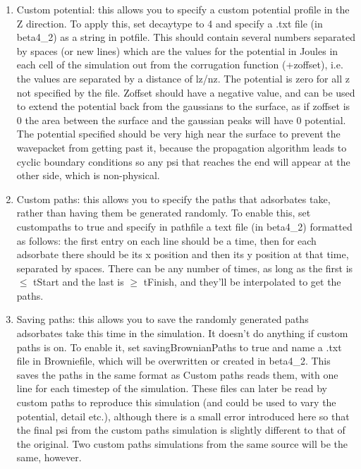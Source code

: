 \documentclass[11pt,letterpaper]{article}
\renewcommand{\\}{\bigskip}
\begin{document}
\begin{enumerate}
    \item Custom potential: this allows you to specify a custom potential profile in the Z direction. To apply this, set decaytype to 4 and specify a .txt file (in beta4\_2) as a string in potfile. This should contain several numbers separated by spaces (or new lines) which are the values for the potential in Joules in each cell of the simulation out from the corrugation function (+zoffset), i.e. the values are separated by a distance of lz/nz. The potential is zero for all z not specified by the file. Zoffset should have a negative value, and can be used to extend the potential back from the gaussians to the surface, as if zoffset is 0 the area between the surface and the gaussian peaks will have 0 potential. The potential specified should be very high near the surface to prevent the wavepacket from getting past it, because the propagation algorithm leads to cyclic boundary conditions so any psi that reaches the end will appear at the other side, which is non-physical.
    \item Custom paths: this allows you to specify the paths that adsorbates take, rather than having them be generated randomly. To enable this, set custompaths to true and specify in pathfile a text file (in beta4\_2) formatted as follows: the first entry on each line should be a time, then for each adsorbate there should be its x position and then its y position at that time, separated by spaces. There can be any number of times, as long as the first is $\leq$ tStart and the last is $\geq$ tFinish, and they’ll be interpolated to get the paths. 
    \item Saving paths: this allows you to save the randomly generated paths adsorbates take this time in the simulation. It doesn’t do anything if custom paths is on. To enable it, set savingBrownianPaths to true and name a .txt file in Browniefile, which will be overwritten or created in beta4\_2. This saves the paths in the same format as Custom paths reads them, with one line for each timestep of the simulation. These files can later be read by custom paths to reproduce this simulation (and could be used to vary the potential, detail etc.), although there is a small error introduced here so that the final psi from the custom paths simulation is slightly different to that of the original. Two custom paths simulations from the same source will be the same, however.
\end{enumerate}
\end{document}
